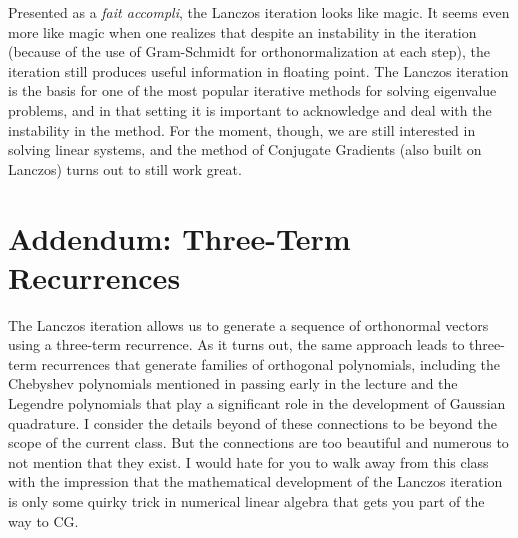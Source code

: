 \documentclass[12pt, leqno]{article}
\begin{document}
Presented as a {\em fait accompli}, the Lanczos iteration looks like
magic.  It seems even more like magic when one realizes that despite
an instability in the iteration (because of the use of Gram-Schmidt
for orthonormalization at each step), the iteration still produces
useful information in floating point.  The Lanczos iteration is the
basis for one of the most popular iterative methods for solving
eigenvalue problems, and in that setting it is important to
acknowledge and deal with the instability in the method.  For the
moment, though, we are still interested in solving linear systems,
and the method of Conjugate Gradients (also built on Lanczos)
turns out to still work great.

\section{Addendum: Three-Term Recurrences}

The Lanczos iteration allows us to generate a sequence of orthonormal
vectors using a three-term recurrence.  As it turns out, the same
approach leads to three-term recurrences that generate families of
orthogonal polynomials, including the Chebyshev polynomials mentioned
in passing early in the lecture and the Legendre polynomials that play
a significant role in the development of Gaussian quadrature.  I
consider the details beyond of these connections to be beyond the
scope of the current class.  But the connections are too beautiful and
numerous to not mention that they exist.  I would hate for you to walk
away from this class with the impression that the mathematical
development of the Lanczos iteration is only some quirky trick in
numerical linear algebra that gets you part of the way to CG.
\end{document}
